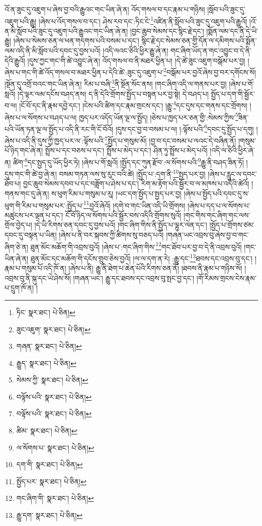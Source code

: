 འོ་ན་ཟུང་དུ་འཇུག་པ་ཞེས་བྱ་བའི་རྒྱུའང་གང་ཡིན་ཞེ་ན། འོད་གསལ་བ་དང་རྣམ་པ་གཉིས། །སློབ་པའི་ཟུང་དུ་འཇུག་པའི་རྒྱུ། །ཞེས་པ་འོད་གསལ་བ་དང་། ཤེས་རབ་དང་:ཏིང་ངེ་\footnote{ཏིང་  སྣར་ཐང་།  པེ་ཅིན། }འཛིན་ནི་སློབ་པའི་ཟུང་དུ་འཇུག་པའི་རྒྱུའོ། །འོ་ན་མི་སློབ་པའི་ཟུང་དུ་འཇུག་པའི་རྒྱུའང་གང་ཡིན་ཞེ་ན། །བྱང་ཆུབ་སེམས་དང་སྙིང་རྗེ་དང་། །སྨོན་ལམ་དང་ནི་དེ་ཡི་རྒྱུ། །ཞེས་པ་སེམས་ཅན་ལ་ཕན་གདགས་པའི་བསམ་པ་དང་། སྙིང་རྗེ་དང་སེམས་ཅན་གྱི་དོན་ལ་དམིགས་པའི་སྨོན་ལམ་འདི་ནི་མི་སློབ་པའི་དབང་དུ་བྱས་པའོ། །འདི་ལའང་ཅིའི་ཕྱིར་རྒྱུ་ཞེ་ན། གང་ཞིག་ཡོད་ན་གང་འབྱུང་བ་དེ་ནི་དེའི་རྒྱུའོ། །དུས་ཀྱང་གང་གི་ཚེ་འབྱུང་ཞེ་ན། འོད་གསལ་བ་ནི་མཐར་ཕྱིན་པ། །དེ་ཚེ་ཟུང་འཇུག་བསྒོམ་པར་བྱ། །ཞེས་པ་གང་གི་ཚེ་འོད་གསལ་བ་མཐར་ཕྱིན་པ་དེའི་ཚེ་:ཟུང་དུ་འཇུག་པ་\footnote{ཟུང་འཇུག་  སྣར་ཐང་།  པེ་ཅིན། }བསྒོམ་པར་བྱའོ་ཞེས་བྱ་བར་དགོངས་སོ། །སྔོན་དུ་འགྲོ་བའང་གང་ཡིན་ཞེ་ན། རིམ་པ་བཞི་\footnote{གཞན་  སྣར་ཐང་།  པེ་ཅིན། }ནི་སྔོན་སོང་ནས། །གང་ཞིག་འདི་ལ་གནས་པར་བྱ། །ཞེས་པ་གོ་སླའོ། །དེ་ལྟར་ལམ་དངོས་བཤད་ནས། ད་ནི་དེའི་གྲོགས་སྤྱོད་པ་བསྟན་པར་བྱ་སྟེ། དེ་བཤད་པ། སྤྱོད་པ་དག་གི་སྦྱོར་བ་ལ། །ངོ་བོ་དང་ནི་རྣམ་དབྱེ་དང་། །ངེས་པའི་ཚིག་དང་རྣམ་གྲངས་དང་། །རྒྱུ་\footnote{རྒྱུད་  སྣར་ཐང་།  པེ་ཅིན། }དང་དུས་དང་གནས་དང་གྲོགས། །ཞེས་པ་ལ་སོགས་པ་བཤད་པ་ལ། ཁྱད་པར་འདོད་ཡོན་ལྔ་ལ་སྤྱོད། །ཅེས་པ་ཁྱད་པར་ཅན་གྱི་:སེམས་ཀྱིས་\footnote{སེམས་ཀྱི་  སྣར་ཐང་།  པེ་ཅིན། }ཟིན་པའི་ཡོན་ཏན་ལྔ་ལ་སྤྱོད་པ་འདི་ནི་རང་གི་ངོ་བོའོ། །དུས་དང་བྱ་བ་བསམ་པ་ལ། །:ལྟོས་པའི་\footnote{བལྟོས་པའི་  སྣར་ཐང་།  པེ་ཅིན། }དབང་དུ་སྤྱོད་པ་དགུ། །ཞེས་པ་འདི་ནི་དུས་ཀྱི་ཁྱད་པར་ལ་:ལྟོས་པའི་\footnote{བལྟོས་པའི་  སྣར་ཐང་།  པེ་ཅིན། }སྤྱོད་པ་གསུམ་མོ། །བྱ་བ་དང་བསམ་པ་ལའང་དེ་བཞིན་ནོ། །གསུམ་པོ་ཉིད་གང་ཞེ་ན། སྤྲོས་པ་དང་བཅས་པ་དང་། སྤྲོས་པ་མེད་པ་དང་། ཤིན་ཏུ་སྤྲོས་པ་མེད་པའོ། །འདི་ལ་ཅིའི་ཕྱིར་ཞེ་ན། ཚིག་\footnote{ཚིམ་  སྣར་ཐང་།  པེ་ཅིན། }དང་སྤྱད་དུ་ཡོད་ཕྱིར་ཏེ། །ཞེས་པ་གོ་སླའོ། །སྤྱོད་དང་ཀུན་རྫོབ་:ལ་སོགས་པའི་\footnote{ལ་སོགས་པ་  སྣར་ཐང་།  པེ་ཅིན། }རྒྱུ་ནི་བཤད་ཟིན་ཏོ། །དུས་གང་གི་ཚེ་བྱ་ཞེ་ན། བསམ་གཏན་ལས་སུ་རུང་བའི་ཚེ། །སྤྱོད་པ་:དག་ནི་\footnote{དག་གི་  སྣར་ཐང་།  པེ་ཅིན། }སྤྱད་པར་བྱ། །ཞེས་པ་རླུང་ལ་དབང་ཐོབ་པ། བྱང་ཆུབ་སེམས་དབབ་པ་དང་བཟློག་པ་ཤེས་པ་དང་། རིག་མ་རྟོག་པའི་སྦྱོར་བ་ལ་མཁས་པ་འདིའི་ཚེའོ། །གནས་གང་དུ་ཞེ་ན། ས་ཕུག་རིམ་པ་གསུམ་པ་རུ། །ཡང་དག་སྤྱོད་པ་སྤྱད་པར་བྱ། །ཞེས་པ་སྤྱོད་པའི་དབང་དུ་ས་ཕུག་གི་རིམ་པ་གསུམ་པར་:སྤྱོད་པ་\footnote{སྤྱོད་པར་  སྣར་ཐང་།  པེ་ཅིན། }བྱའོ་ཞེའོ། །དགེ་བ་གང་ཡིན་འདི་ཡི་གྲོགས། །ཞེས་པ་དད་པ་ལ་སོགས་པ་མཚུངས་པར་ལྡན་པ་དང་། ངོ་བོ་ཉིད་ལ་སོགས་པའི་སྦྱོར་བས་འདིའི་གྲོགས་སུའོ། །གང་གིས་གང་ཞིག་གང་ལས་གྲོལ་བྱེད་པ། །དེ་ཡི་རིགས་ཅན་དབང་དུ་བྱས་པའོ། །གང་ཞིག་གིས་ནི་སྤྱོད་པ་ལྷུར་ལེན་དང་། །སྤྱོད་པ་གྲོགས་ཙམ་དབང་དུ་བསྟན་པ་ཡིན། །ཞེས་པ་ནི་བར་སྐབས་ཀྱི་ཚིགས་སུ་བཅད་པའོ། །གཞན་ཡང་འབྲས་བུ་ཞེས་བྱ་བ་གང་ཞིག་ཅེ་ན། ཐུན་མོང་མཆོག་གི་འབྲས་བུའོ། །ཞེས་པ་:གང་ཞིག་གིས་\footnote{གང་ཞིག་གི་  སྣར་ཐང་།  པེ་ཅིན། }གང་ཐོབ་པར་བྱ་བ་དེ་ནི་འབྲས་བུའོ། །གང་ཡིན་ཞེ་ན། ཐུན་མོང་དང་མཆོག་གི་དངོས་གྲུབ་ཅེས་བྱའོ། །ལ་ལ་དག་ན་རེ། :རྒྱུ་དང་\footnote{རྒྱུ་དག་  སྣར་ཐང་།  པེ་ཅིན། }ཐབས་དང་འབྲས་བུ་དང་། །རྣམ་པ་གསུམ་པོ་འདི་ཁོ་ན། །ཞེས་པ་ནི། རྒྱུ་ནི་ཐེག་པ་ཆེན་པོའི་རིགས་ཅན་ནོ། །ཐབས་ནི་རྣམ་པ་གཉིས་སོ། །འབྲས་བུ་ནི་སྐུ་དང་ཡེ་ཤེས་སོ། །གཞན་ཡང་། རྒྱུ་དང་ཐབས་དང་འབྲས་བུ་སྤང་བྱ་དང་། །གོ་རིམས་གྲངས་ངེས་རྣམ་པ་དྲུག་ཁོ་ན། །
